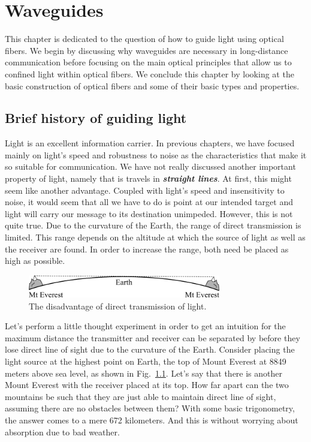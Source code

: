 \chapter{Waveguides}
\label{sec:7_waveguides}

This chapter is dedicated to the question of how to guide light using optical fibers.
We begin by discussing why waveguides are necessary in long-distance communication before focusing on the main optical principles that allow us to confined light within optical fibers.
We conclude this chapter by looking at the basic construction of optical fibers and some of their basic types and properties.

\section{Brief history of guiding light}
\label{sec:7-1_history}

Light is an excellent information carrier.
In previous chapters, we have focused mainly on light's speed and robustness to noise as the characteristics that make it so suitable for communication.
We have not really discussed another important property of light, namely that is travels in \textit{\textbf{straight lines}}.
At first, this might seem like another advantage.
Coupled with light's speed and insensitivity to noise, it would seem that all we have to do is point at our intended target and light will carry our message to its destination unimpeded.
However, this is not quite true.
Due to the curvature of the Earth, the range of direct transmission is limited.
This range depends on the altitude at which the source of light as well as the receiver are found.
In order to increase the range, both need be placed as high as possible.

\begin{figure}[H]
    \centering
    \includegraphics[width=0.75\textwidth]{lesson7/7-1_everest.pdf}
    \caption[Two Everests]{The disadvantage of direct transmission of light.}
    \label{fig:7-1_everest}
\end{figure}

Let's perform a little thought experiment in order to get an intuition for the maximum distance the transmitter and receiver can be separated by before they lose direct line of sight due to the curvature of the Earth.
Consider placing the light source at the highest point on Earth, the top of Mount Everest at 8849 meters above sea level, as shown in Fig.~\ref{fig:7-1_everest}.
Let's say that there is another Mount Everest with the receiver placed at its top.
How far apart can the two mountains be such that they are just able to maintain direct line of sight, assuming there are no obstacles between them?
With some basic trigonometry, the answer comes to a mere 672 kilometers.
And this is without worrying about absorption due to bad weather.

